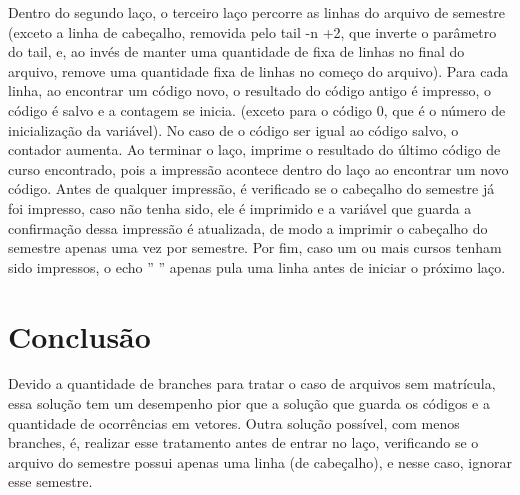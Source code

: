\documentclass[oneside, 11 pt]{article}
\begin{document}
	Dentro do segundo laço, o terceiro laço percorre as linhas do arquivo de semestre (exceto a linha de cabeçalho, removida pelo tail -n +2, que inverte o parâmetro do tail, e, ao invés de manter uma quantidade de fixa de linhas no final do arquivo, remove uma quantidade fixa de linhas no começo do arquivo). Para cada linha, ao encontrar um código novo, o resultado do código antigo é impresso, o código é salvo e a contagem se inicia. (exceto para o código 0, que é o número de inicialização da variável). No caso de o código ser igual ao código salvo, o contador aumenta. Ao terminar o laço, imprime o resultado do último código de curso encontrado, pois a impressão acontece dentro do laço ao encontrar um novo código. Antes de qualquer impressão, é verificado se o cabeçalho do semestre já foi impresso, caso não tenha sido, ele é imprimido e a variável que guarda a confirmação dessa impressão é atualizada, de modo a imprimir o cabeçalho do semestre apenas uma vez por semestre. Por fim, caso um ou mais cursos tenham sido impressos, o echo '' '' apenas pula uma linha antes de iniciar o próximo laço.
	
	\section{Conclusão}
	Devido a quantidade de branches para tratar o caso de arquivos sem matrícula, essa solução tem um desempenho pior que a solução que guarda os códigos e a quantidade de ocorrências em vetores. Outra solução possível, com menos branches, é, realizar esse tratamento antes de entrar no laço, verificando se o arquivo do semestre possui apenas uma linha (de cabeçalho), e nesse caso, ignorar esse semestre.
	

\end{document}
